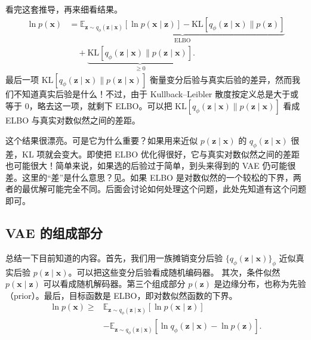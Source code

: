 看完这套推导，再来细看结果。
\begin{equation}
\begin{aligned}
\ln p(\mathbf{x})
 &=\underbrace{\mathbb{E}_{\mathbf{z}\sim q_\phi(\mathbf{z}\mid\mathbf{x})}[\ln p(\mathbf{x}\mid\mathbf{z})]
       -\mathrm{KL}[q_\phi(\mathbf{z}\mid\mathbf{x})\|p(\mathbf{z})]}_{\mathrm{ELBO}}\\
 &\quad+\underbrace{\mathrm{KL}[q_\phi(\mathbf{z}\mid\mathbf{x})\|p(\mathbf{z}\mid\mathbf{x})]}_{\geq 0}.
\end{aligned}
\tag{5.25}\label{eq:05-25}
\end{equation}
最后一项 $\mathrm{KL}[q_\phi(\mathbf{z}\mid\mathbf{x})\|p(\mathbf{z}\mid\mathbf{x})]$ 衡量变分后验与真实后验的差异，然而我们不知道真实后验是什么！不过，由于 Kullback–Leibler 散度按定义总是大于或等于 0，略去这一项，就剩下 ELBO。可以把 $\mathrm{KL}[q_\phi(\mathbf{z}\mid\mathbf{x})\|p(\mathbf{z}\mid\mathbf{x})]$ 看成 ELBO 与真实对数似然之间的差距。

这个结果很漂亮。可是它为什么重要？如果用来近似 $p(\mathbf{z}\mid\mathbf{x})$ 的 $q_\phi(\mathbf{z}\mid\mathbf{x})$ 很差，KL 项就会变大。即使把 ELBO 优化得很好，它与真实对数似然之间的差距也可能很大！简单来说，如果选的后验过于简单，到头来得到的 VAE 仍可能很差。这里的“差”是什么意思？见。如果 ELBO 是对数似然的一个较松的下界，两者的最优解可能完全不同。后面会讨论如何处理这个问题，此处先知道有这个问题即可。

\subsection{VAE 的组成部分}
总结一下目前知道的内容。首先，我们用一族摊销变分后验 $\{q_\phi(\mathbf{z}\mid\mathbf{x})\}_\phi$ 近似真实后验 $p(\mathbf{z}\mid\mathbf{x})$。可以把这些变分后验看成随机编码器。
其次，条件似然 $p(\mathbf{x}\mid\mathbf{z})$ 可以看成随机解码器。第三个组成部分 $p(\mathbf{z})$ 是边缘分布，也称为先验（prior）。最后，目标函数是 ELBO，即对数似然函数的下界。
\begin{equation}
\begin{aligned}
\ln p(\mathbf{x})\geq{}&\mathbb{E}_{\mathbf{z}\sim q_\phi(\mathbf{z}\mid\mathbf{x})}[\ln p(\mathbf{x}\mid\mathbf{z})]\\
 &-\mathbb{E}_{\mathbf{z}\sim q_\phi(\mathbf{z}\mid\mathbf{x})}
      [\ln q_\phi(\mathbf{z}\mid\mathbf{x})-\ln p(\mathbf{z})].
\end{aligned}
\tag{5.26}\label{eq:05-26}
\end{equation}

